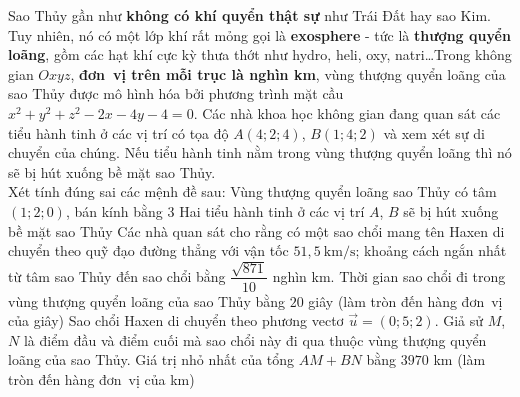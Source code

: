 \begin{ex}%
	Sao Thủy gần như \textbf{không có khí quyển thật sự} như Trái Đất hay sao Kim. Tuy nhiên, nó có một lớp khí rất mỏng gọi là \textbf{exosphere} - tức là \textbf{thượng quyển loãng}, gồm các hạt khí cực kỳ thưa thớt như hydro, heli, oxy, natri\ldots Trong không  gian $Oxyz$, \textbf{đơn~vị trên mỗi trục là nghìn km}, vùng thượng quyển loãng của sao Thủy được mô hình hóa bởi phương trình mặt cầu $x^2+y^2+z^2-2x-4y-4=0$. Các nhà khoa học không gian đang quan sát các tiểu hành tinh ở các vị trí có tọa độ $A(4;2;4)$, $B(1;4;2)$ và xem xét sự di chuyển của chúng. Nếu tiểu hành tinh nằm trong vùng thượng quyển loãng thì nó sẽ bị hút xuống bề mặt sao Thủy.\\
	Xét tính  đúng sai các mệnh đề sau:
	 \choiceTF
		{\True Vùng thượng quyển loãng sao Thủy có tâm $(1;2;0)$, bán  kính bằng $3$}
		{Hai tiểu hành tinh  ở các vị trí $A$, $B$ sẽ bị hút xuống bề mặt sao Thủy}
		{Các nhà quan sát cho rằng có  một sao chổi mang tên Haxen di chuyển theo quỹ đạo đường thẳng với vận tốc $51{,}5~\mathrm{km/s}$; khoảng cách ngắn nhất từ tâm sao Thủy đến sao chổi bằng $\dfrac{\sqrt{871}}{10}$ nghìn km. Thời gian sao chổi đi trong vùng thượng quyển loãng của sao Thủy bằng $20$ giây (làm tròn đến hàng đơn~vị của giây)}
		{\True Sao chổi Haxen di chuyển theo phương vectơ $\overrightarrow{u}=(0; 5; 2)$. Giả sử $M$, $N$ là điểm đầu và điểm cuối mà sao chổi này đi qua thuộc vùng  thượng quyển loãng của sao Thủy. Giá trị nhỏ nhất của tổng $AM+BN$ bằng $3970$ km (làm tròn đến hàng đơn~vị của km)}
\end{ex}
